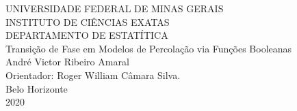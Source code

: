 \newpage

\begin{center}
	{\normalsize UNIVERSIDADE FEDERAL DE MINAS GERAIS} \\
	{\normalsize INSTITUTO DE CIÊNCIAS EXATAS} \\
	{\normalsize DEPARTAMENTO DE ESTATÍTICA} \\ \vspace{6cm}
	{\LARGE Transição de Fase em Modelos de Percolação via Funções Booleanas} \\ \vspace{4.4cm}
	{\Large André Victor Ribeiro Amaral} \\ \vspace{0.75cm}
	{\large Orientador: Roger William Câmara Silva.} \\ \vspace{7cm}
	{\normalsize Belo Horizonte} \\
	{\normalsize 2020}
\end{center}

\thispagestyle{empty}